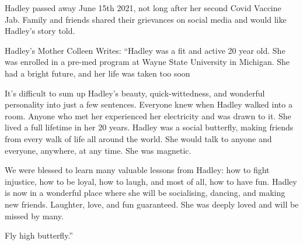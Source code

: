 Hadley passed away June 15th 2021, not long after her second Covid Vaccine
Jab. Family and friends shared their grievances on social media and would like
Hadley’s story told.

Hadley’s Mother Colleen Writes: “Hadley was a fit and active 20 year old. She
was enrolled in a pre-med program at Wayne State University in Michigan. She had
a bright future, and her life was taken too soon

It’s difficult to sum up Hadley’s beauty, quick-wittedness, and wonderful
personality into just a few sentences. Everyone knew when Hadley walked into a
room. Anyone who met her experienced her electricity and was drawn to it. She
lived a full lifetime in her 20 years. Hadley was a social butterfly, making
friends from every walk of life all around the world. She would talk to anyone
and everyone, anywhere, at any time. She was magnetic.

We were blessed to learn many valuable lessons from Hadley: how to fight
injustice, how to be loyal, how to laugh, and most of all, how to have
fun. Hadley is now in a wonderful place where she will be socialising, dancing,
and making new friends. Laughter, love, and fun guaranteed. She was deeply loved
and will be missed by many.

Fly high butterfly.”

